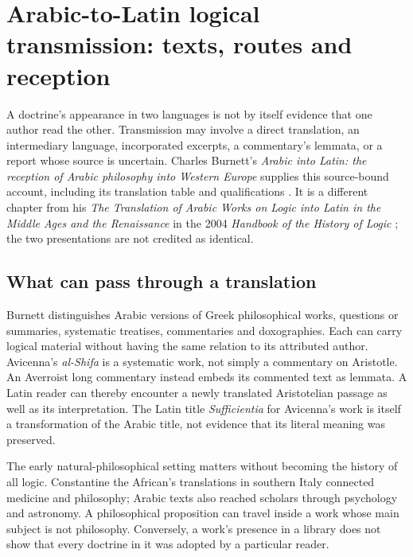 \chapter{Arabic-to-Latin logical transmission: texts, routes and reception}
\label{sec:p13-arabic-latin-logical-transmission}

A doctrine's appearance in two languages is not by itself evidence
that one author read the other. Transmission may involve a direct
translation, an intermediary language, incorporated excerpts,
a commentary's lemmata, or a report whose source is uncertain.
Charles Burnett's \emph{Arabic into Latin: the reception of Arabic
philosophy into Western Europe} supplies this source-bound account,
including its translation table and qualifications
\cite{Burnett2005ArabicLatinSupplement}. It is a different chapter
from his \emph{The Translation of Arabic Works on Logic into Latin
in the Middle Ages and the Renaissance} in the 2004 \emph{Handbook
of the History of Logic} \cite{Burnett2004ArabicLatinHHL}; the
two presentations are not credited as identical.

\section{What can pass through a translation}
\label{sec:p13-arabic-latin-objects}

Burnett distinguishes Arabic versions of Greek philosophical works,
questions or summaries, systematic treatises, commentaries and
doxographies. Each can carry logical material without having the
same relation to its attributed author. Avicenna's \emph{al-Shifa}
is a systematic work, not simply a commentary on Aristotle.
An Averroist long commentary instead embeds its commented text
as lemmata. A Latin reader can thereby encounter a newly translated
Aristotelian passage as well as its interpretation. The Latin title
\emph{Sufficientia} for Avicenna's work is itself a transformation
of the Arabic title, not evidence that its literal meaning was preserved.
\cite[pp.~370--371, 374--377, 387, note~6]{Burnett2005ArabicLatinSupplement}

The early natural-philosophical setting matters without becoming
the history of all logic. Constantine the African's translations
in southern Italy connected medicine and philosophy; Arabic
texts also reached scholars through psychology and astronomy.
A philosophical proposition can travel inside a work whose main
subject is not philosophy. Conversely, a work's presence in a
library does not show that every doctrine in it was adopted
by a particular reader.
\cite[pp.~371--372, 383--385]{Burnett2005ArabicLatinSupplement}

